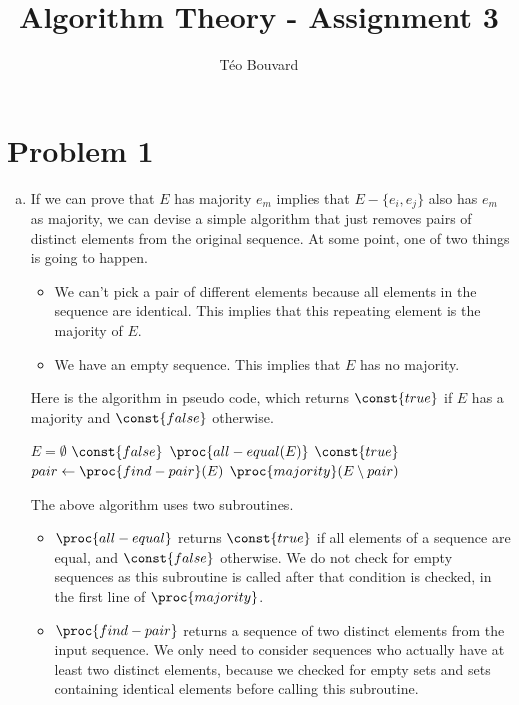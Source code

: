 \documentclass[a4paper, 10pt, twoside]{article}
\begin{document}
\title{Algorithm Theory - Assignment 3}
\author{T\'eo Bouvard}
\maketitle

\section*{Problem 1}
\begin{enumerate}[a)]
	\item If we can prove that $E$ has majority $e_m$ implies that  $E - \{e_i, e_j\}$ also has $e_m$ as majority, we can devise a simple algorithm that just removes pairs of distinct elements from the original sequence. At some point, one of two things is going to happen.

	      \begin{itemize}
		      \item We can't pick a pair of different elements because all elements in the sequence are identical. This implies that this repeating element is the majority of $E$.
		      \item We have an empty sequence. This implies that $E$ has no majority.
	      \end{itemize}

	      Here is the algorithm in pseudo code, which returns $\const{true}$ if $E$ has a majority and $\const{false}$ otherwise.

	      \begin{codebox}
		      \zi \If $E = \emptyset$
		      \zi \Then \Return $\const{false}$ \End
		      \zi \If $\proc{all-equal(E)}$
		      \zi \Then \Return $\const{true}$ \End
		      \zi $pair \gets \proc{find-pair}(E)$
		      \zi \Return $\proc{majority}(E \setminus pair)$ \End
	      \end{codebox}

	      The above algorithm uses two subroutines.

	      \begin{itemize}
		      \item $\proc{all-equal}$ returns $\const{true}$ if all elements of a sequence are equal, and $\const{false}$ otherwise. We do not check for empty sequences as this subroutine is called after that condition is checked, in the first line of $\proc{majority}$.
		      \item $\proc{find-pair}$ returns a sequence of two distinct elements from the input sequence. We only need to consider sequences who actually have at least two distinct elements, because we checked for empty sets and sets containing identical elements before calling this subroutine.
	      \end{itemize}


\end{enumerate}
\end{document}
